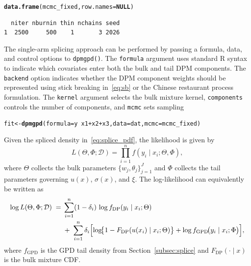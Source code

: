 \documentclass[article]{jss}\usepackage[]{graphicx}\usepackage[]{xcolor}
\makeatletter
\newcommand{\hlopt}[1]{\textcolor[rgb]{0,0,0}{#1}}%
\newcommand{\hldef}[1]{\textcolor[rgb]{0.345,0.345,0.345}{#1}}%
\newcommand{\hlkwa}[1]{\textcolor[rgb]{0.161,0.373,0.58}{\textbf{#1}}}%
\newcommand{\hlkwb}[1]{\textcolor[rgb]{0.69,0.353,0.396}{#1}}%
\newcommand{\hlkwc}[1]{\textcolor[rgb]{0.333,0.667,0.333}{#1}}%
\newcommand{\hlkwd}[1]{\textcolor[rgb]{0.737,0.353,0.396}{\textbf{#1}}}%
\newenvironment{kframe}{%
 \def\at@end@of@kframe{}%
 \ifinner\ifhmode%
  \def\at@end@of@kframe{\end{minipage}}%
  \begin{minipage}{\columnwidth}%
 \fi\fi%
 \def\FrameCommand##1{\hskip\@totalleftmargin \hskip-\fboxsep
 \colorbox{shadecolor}{##1}\hskip-\fboxsep
     \hskip-\linewidth \hskip-\@totalleftmargin \hskip\columnwidth}%
 \MakeFramed {\advance\hsize-\width
   \@totalleftmargin\z@ \linewidth\hsize
   \@setminipage}}%
 {\par\unskip\endMakeFramed%
 \at@end@of@kframe}
\newenvironment{knitrout}{}{} %
\DeclareRobustCommand{\code}[1]{\nolinkurl{#1}}
\makeatother
\begin{document}
\begin{knitrout}\footnotesize
{}\color{fgcolor}\begin{kframe}
\begin{alltt}
\hlkwd{data.frame}\hldef{(mcmc_fixed,}\hlkwc{row.names} \hldef{=} \hlkwa{NULL}\hldef{)}
\end{alltt}
\begin{verbatim}
  niter nburnin thin nchains seed
1  2500     500    1       3 2026
\end{verbatim}
\end{kframe}
\end{knitrout}

The single-arm splicing approach can be performed by passing a
formula, data, and control options to \code{dpmgpd()}. The
\code{formula} argument uses standard \textsf{R} syntax to indicate
which covariates enter both the bulk and tail DPM components.
The \code{backend} option indicates whether the DPM component
weights should be represented using stick breaking in~\eqref{eq:sb}
or the Chinese restaurant process formulation. The \code{kernel}
argument selects the bulk mixture kernel, \code{components}
controls the number of components, and \code{mcmc} sets sampling

\begin{knitrout}\footnotesize
{}\color{fgcolor}\begin{kframe}
\begin{alltt}
\hldef{fit} \hlkwb{<-} \hlkwd{dpmgpd}\hldef{(}\hlkwc{formula} \hldef{= y} \hlopt{~} \hldef{x1} \hlopt{+} \hldef{x2} \hlopt{+} \hldef{x3,} \hlkwc{data} \hldef{= dat,} \hlkwc{mcmc} \hldef{= mcmc_fixed)}
\end{alltt}
\end{kframe}
\end{knitrout}

Given the spliced density in~\eqref{eq:splice_pdf}, the likelihood is given by
\begin{equation}
  L(\Theta,\Phi;\mathcal{D})
  =\prod_{i=1}^n f(y_i\mid x_i;\Theta,\Phi),
  \label{eq:overview-lik}
\end{equation}
where $\Theta$ collects the bulk parameters
$\{w_j,\theta_j\}_{j=1}^J$ and $\Phi$ collects the tail parameters
governing $u(x)$, $\sigma(x)$, and $\xi$.  The log-likelihood can
equivalently be written as
\begin{align}
  \log L(\Theta,\Phi;\mathcal{D})
  \;=&\;\sum_{i=1}^n (1-\delta_i)\,\log f_{\mathrm{DP}}(y_i\mid x_i;\Theta)
  \nonumber\\
  &\;+\;\sum_{i=1}^n \delta_i
  \Bigl[
    \log\!\bigl\{1-F_{\mathrm{DP}}(u(x_i)\mid x_i;\Theta)\bigr\}
    +\log f_{\mathrm{GPD}}\!\bigl(y_i\mid x_i;\Phi\bigr)
  \Bigr],
  \label{eq:overview-loglik}
\end{align}
where $f_{\mathrm{GPD}}$ is the GPD tail density from
Section~\ref{subsec:splice} and $F_{\mathrm{DP}}(\cdot\mid x)$ is the
bulk mixture CDF.
\end{document}
